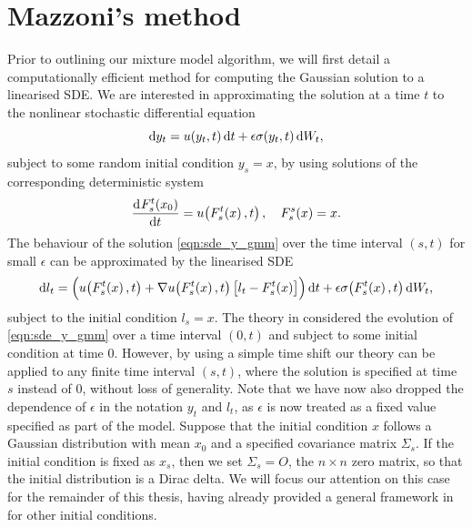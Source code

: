 \section{Mazzoni's method}\label{sec:mazzoni}
Prior to outlining our mixture model algorithm, we will first detail a computationally efficient method for computing the Gaussian solution to a linearised SDE.
We are interested in approximating the solution at a time \(t\) to the nonlinear stochastic differential equation
\begin{equation}
	\dif y_t = u\!\left(y_t, t\right)\dif t + \epsilon\sigma\!\left(y_t, t\right)\dif W_t,
	\label{eqn:sde_y_gmm}
\end{equation}
subject to some random initial condition \(y_s = x\), by using solutions of the corresponding deterministic system
\begin{equation}
	\dod{F_s^t\!\left(x_0\right)}{t} = u\!\left(F_s^t\!\left(x\right), t\right), \quad F_s^s\!\left(x\right) = x.
	\label{eqn:det_ode_gmm}
\end{equation}
The behaviour of the solution \cref{eqn:sde_y_gmm} over the time interval \((s,t)\) for small \(\epsilon\) can be approximated by the linearised SDE
\begin{equation}
	\dif l_t = \left(u\!\left(F_s^t\!\left(x\right), t\right) + \nabla u\!\left(F_s^t\!\left(x\right), t\right)\left[l_t - F_s^t\!\left(x\right)\right]\right)\dif t + \epsilon\sigma\!\left(F_s^t\!\left(x\right), t\right)\dif W_t,
	\label{eqn:sde_linear_gmm}
\end{equation}
subject to the initial condition \(l_s = x\).
The theory in  considered the evolution of \cref{eqn:sde_y_gmm} over a time interval \((0,t)\) and subject to some initial condition at time \(0\).
However, by using a simple time shift our theory can be applied to any finite time interval \((s,t)\), where the solution is specified at time \(s\) instead of \(0\), without loss of generality.
Note that we have now also dropped the dependence of \(\epsilon\) in the notation \(y_t\) and \(l_t\), as \(\epsilon\) is now treated as a fixed value specified as part of the model.
Suppose that the initial condition \(x\) follows a Gaussian distribution with mean \(x_0\) and a specified covariance matrix \(\Sigma_s\).
If the initial condition is fixed as \(x_s\), then we set \(\Sigma_s = O\), the \(n \times n\) zero matrix, so that the initial distribution is a Dirac delta.
We will focus our attention on this case for the remainder of this thesis, having already provided a general framework in  for other initial conditions.
